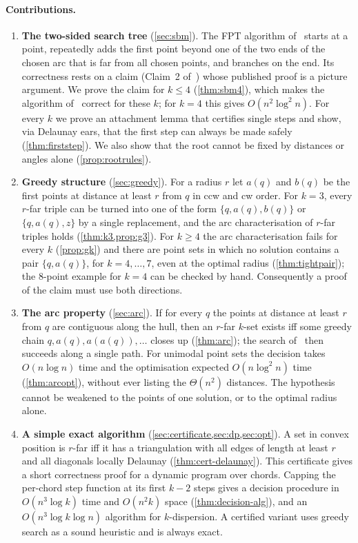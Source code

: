 \documentclass[11pt,a4paper]{article}
\theoremstyle{definition}
\theoremstyle{remark}
\begin{document}
\paragraph{Contributions.}
\begin{enumerate}[leftmargin=*,itemsep=2pt]
\item \textbf{The two-sided search tree} (\cref{sec:sbm}). The FPT algorithm
of~\cite{sbm} starts at a point, repeatedly adds the first point beyond one of
the two ends of the chosen arc that is far from all chosen points, and
branches on the end. Its correctness rests on a claim (Claim~2 of~\cite{sbm})
whose published proof is a picture argument. We prove the claim for $k\le4$
(\cref{thm:sbm4}), which makes the algorithm of~\cite{sbm} correct for these
$k$; for $k=4$ this gives $O(n^2\log^2n)$. For every $k$ we prove an
attachment lemma that certifies single steps and show, via Delaunay ears,
that the first step can always be made safely (\cref{thm:firststep}). We also
show that the root cannot be fixed by distances or angles alone
(\cref{prop:rootrules}).

\item \textbf{Greedy structure} (\cref{sec:greedy}). For a radius $r$ let $a(q)$
and $b(q)$ be the first points at distance at least $r$ from $q$ in ccw and cw
order. For $k=3$, every $r$-far triple can be turned into one of the form
$\{q,a(q),b(q)\}$ or $\{q,a(q),z\}$ by a single replacement, and the arc
characterisation of $r$-far triples holds (\cref{thm:k3,prop:g3}).
For $k\ge4$ the arc characterisation fails for every $k$ (\cref{prop:gk}) and
there are point sets in which no solution contains a pair $\{q,a(q)\}$, for
$k=4,\dots,7$, even at the optimal radius (\cref{thm:tightpair}); the
$8$-point example for $k=4$ can be checked by hand. Consequently a proof of the
claim must use both directions.

\item \textbf{The arc property} (\cref{sec:arc}). If for every $q$ the points
at distance at least $r$ from $q$ are contiguous along the hull, then an
$r$-far $k$-set exists iff some greedy chain $q,a(q),a(a(q)),\dots$ closes up
(\cref{thm:arc}); the search of~\cite{sbm} then succeeds along a single path.
For unimodal point sets the decision takes $O(n\log n)$ time and the
optimisation expected $O(n\log^2n)$ time (\cref{thm:arcopt}), without ever
listing the $\Theta(n^2)$ distances. The hypothesis cannot be weakened to the
points of one solution, or to the optimal radius alone.

\item \textbf{A simple exact algorithm} (\cref{sec:certificate,sec:dp,sec:opt}).
A set in convex position is $r$-far iff it has a triangulation with all edges
of length at least $r$ and all diagonals locally Delaunay
(\cref{thm:cert-delaunay}). This certificate gives a short correctness proof
for a dynamic program over chords. Capping the per-chord step function at its
first $k-2$ steps gives a decision procedure in $O(n^3\log k)$ time and
$O(n^2k)$ space (\cref{thm:decision-alg}), and an $O(n^3\log k\log n)$ algorithm
for $k$-dispersion. A certified variant uses greedy search as a sound
heuristic and is always exact.
\end{enumerate}
\end{document}
